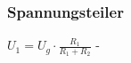 \subsubsection{Spannungsteiler} 
\begin{minipage}{0.45\textwidth} 
\end{minipage} 
\begin{minipage}{0.45\textwidth} 
 
\legende{}\end{minipage} 
 
$ U_{1}  = U_{g} \cdot \frac{ R_{1} }{R_{1} +R_{2} } $ - \\ 
 

